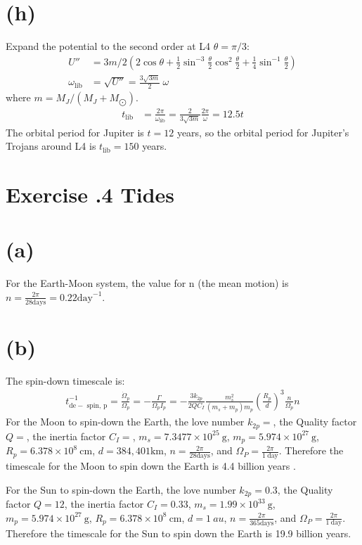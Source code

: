 \documentclass[a4paper,12pt]{article}
\newcommand{\cm}{\mathrm{cm}}
\newcommand{\g}{\mathrm{g}}
\begin{document}
\section*{(h)}
Expand the potential to the second order at L4 $\theta=\pi/3$:
\begin{align*}
    U'' &= 3m/2(2\cos \theta + \frac{1}{2} \sin^{-3} \frac{\theta}{2} \cos ^2 \frac{\theta}{2} + \frac{1}{4} \sin ^{-1} \frac{\theta}{2}) \\
    \omega_{\text{lib}} &= \sqrt{U''} = \frac{3\sqrt{3m}}{2} \ \omega
\end{align*}
where $m = M_J/(M_J + M_{\bigodot})$.
\begin{align*}
    t_{\text{lib}} &= \frac{2\pi}{\omega_{\text{lib}}} = \frac{2}{3\sqrt{3m}}\frac{2\pi}{\omega} = 12.5 t
\end{align*}
The orbital period for Jupiter is $t=12$ years, so the orbital period for Jupiter's Trojans around L4 is $t_{\text{lib}}=150$ years.

\section*{\textbf{Exercise \uppercase\expandafter{}.4 Tides}}
\section*{(a)}
For the Earth-Moon system, the value for n (the mean motion) is $n = \frac{2\pi}{28 \text{days}} = 0.22 \text{day}^{-1}$.

\section*{(b)}
The spin-down timescale is:
\begin{align*}
    t_{\mathrm{de}-\text { spin, } \mathrm{p}}^{-1}=\frac{\dot{\Omega}_p}{\Omega_p}=-\frac{\Gamma}{\Omega_p I_p}=-\frac{3 k_{2 p}}{2 Q C_I} \frac{m_s^2}{\left(m_s+m_p\right) m_p}\left(\frac{R_p}{d}\right)^3 \frac{n}{\Omega_p} n
\end{align*}
For the Moon to spin-down the Earth, the love number $k_{2p} = $, the Quality factor $Q = $, 
the inertia factor $C_I = $, $m_s = 7.3477\times 10^{25} \ \g$, $m_p =5.974\times 10^{27} \ \g $, $R_p = 6.378\times 10^8 \ \cm$, $d = 384,401 \text{km}$, $n = \frac{2\pi}{28 \text{days}}$, and $\Omega_P = \frac{2\pi}{1 \ \text{day}}$. 
Therefore the timescale for the Moon to spin down the Earth is 4.4 billion years .

For the Sun to spin-down the Earth, the love number $k_{2p} = 0.3$, the Quality factor $Q = 12$, 
the inertia factor $C_I = 0.33$, $m_s = 1.99\times 10^{33}\ \g$, $m_p =5.974\times 10^{27} \ \g $, $R_p = 6.378\times 10^8 \ \cm$, $d = 1 \ au$, $n = \frac{2\pi}{365 \text{days}}$, and $\Omega_P = \frac{2\pi}{1 \ \text{day}}$.
Therefore the timescale for the Sun to spin down the Earth is 19.9 billion years.
\end{document}
